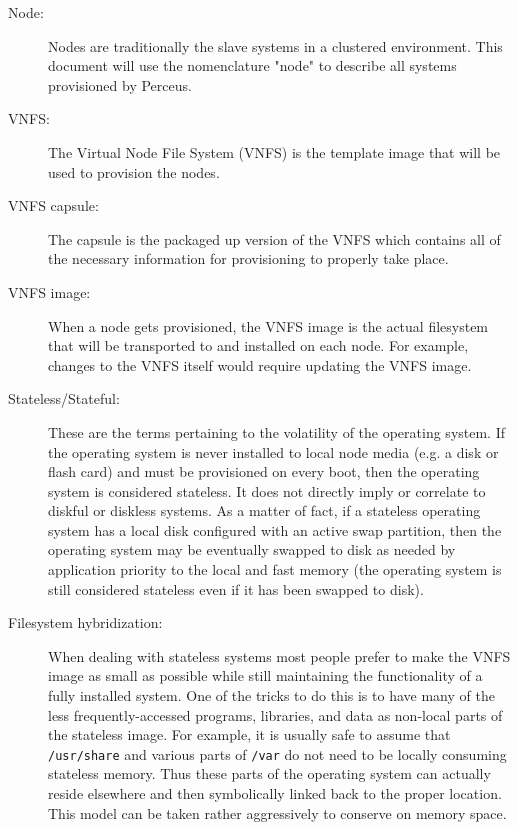 \documentclass[10pt,letterpaper]{report}
\begin{document}
\begin{description}

\item[Node:] Nodes are traditionally the slave systems in a clustered
environment. This document will use the nomenclature "node" to describe all
systems provisioned by Perceus.

\item[VNFS:] The Virtual Node File System (VNFS) is the template image that
will be used to provision the nodes.

\item[VNFS capsule:] The capsule is the packaged up version of the VNFS which
contains all of the necessary information for provisioning to properly take
place.

\item[VNFS image:] When a node gets provisioned, the VNFS image is the actual
filesystem that will be transported to and installed on each node. For example,
changes to the VNFS itself would require updating the VNFS image.

\item[Stateless/Stateful:] These are the terms pertaining to the volatility of
the operating system. If the operating system is never installed to local node
media (e.g. a disk or flash card) and must be provisioned on every boot, then
the operating system is considered stateless. It does not directly imply or
correlate to diskful or diskless systems. As a matter of fact, if a stateless
operating system has a local disk configured with an active swap partition,
then the operating system may be eventually swapped to disk as needed by
application priority to the local and fast memory (the operating system is
still considered stateless even if it has been swapped to disk).

\item[Filesystem hybridization:] When dealing with stateless systems most
people prefer to make the VNFS image as small as possible while still
maintaining the functionality of a fully installed system. One of the tricks to
do this is to have many of the less frequently-accessed programs, libraries,
and data as non-local parts of the stateless image. For example, it is usually
safe to assume that {\tt /usr/share} and various parts of {\tt /var} do not
need to be locally consuming stateless memory. Thus these parts of the
operating system can actually reside elsewhere and then symbolically linked
back to the proper location. This model can be taken rather aggressively to
conserve on memory space.


\end{description}
\end{document}
